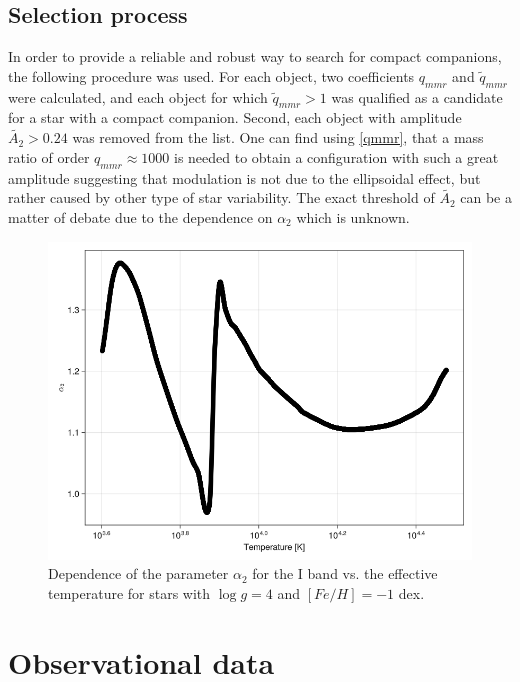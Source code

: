 \documentclass{pracalicmgr}
\begin{document}
\section{Selection process}
In order to provide  a reliable and robust way to search for compact companions, the following procedure was used.
For each object, two coefficients $q_{mmr}$ and $\tilde{q}_{mmr}$ were calculated, and each object for which $\tilde{q}_{mmr}>1$ was qualified as a candidate for a star with a compact companion.
Second, each object with amplitude $\tilde{A_2}>0.24$ was removed from the list. One can find using \ref{qmmr}, that a mass ratio of order $q_{mmr}\approx 1000$ is needed
to obtain a configuration with such a great amplitude
suggesting that modulation is not due to the ellipsoidal effect, but rather caused by other type of star variability.
The exact threshold of $\tilde{A_2}$ can be a matter of debate due to the dependence on $\alpha_2$ which is unknown. 
\begin{figure}[H]
    \centering
    \includegraphics[scale=0.4]{plots/A_2_dependence.png}
    \caption{Dependence of the parameter $\alpha_2$ for the I band vs. the effective temperature for stars with $\log g = 4$ and $[Fe/H] = -1$ dex.}
    \label{claret}
\end{figure}

\chapter{Observational data}
\end{document}

